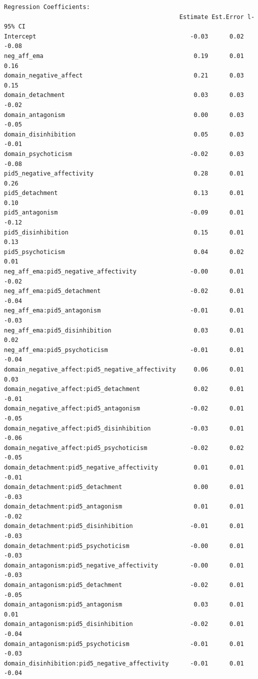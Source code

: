 \documentclass[
  11pt,
  a4paper,
  onecolumn]{article}
\begin{document}
\begin{verbatim}
Regression Coefficients:
                                                 Estimate Est.Error l-95% CI
Intercept                                           -0.03      0.02    -0.08
neg_aff_ema                                          0.19      0.01     0.16
domain_negative_affect                               0.21      0.03     0.15
domain_detachment                                    0.03      0.03    -0.02
domain_antagonism                                    0.00      0.03    -0.05
domain_disinhibition                                 0.05      0.03    -0.01
domain_psychoticism                                 -0.02      0.03    -0.08
pid5_negative_affectivity                            0.28      0.01     0.26
pid5_detachment                                      0.13      0.01     0.10
pid5_antagonism                                     -0.09      0.01    -0.12
pid5_disinhibition                                   0.15      0.01     0.13
pid5_psychoticism                                    0.04      0.02     0.01
neg_aff_ema:pid5_negative_affectivity               -0.00      0.01    -0.02
neg_aff_ema:pid5_detachment                         -0.02      0.01    -0.04
neg_aff_ema:pid5_antagonism                         -0.01      0.01    -0.03
neg_aff_ema:pid5_disinhibition                       0.03      0.01     0.02
neg_aff_ema:pid5_psychoticism                       -0.01      0.01    -0.04
domain_negative_affect:pid5_negative_affectivity     0.06      0.01     0.03
domain_negative_affect:pid5_detachment               0.02      0.01    -0.01
domain_negative_affect:pid5_antagonism              -0.02      0.01    -0.05
domain_negative_affect:pid5_disinhibition           -0.03      0.01    -0.06
domain_negative_affect:pid5_psychoticism            -0.02      0.02    -0.05
domain_detachment:pid5_negative_affectivity          0.01      0.01    -0.01
domain_detachment:pid5_detachment                    0.00      0.01    -0.03
domain_detachment:pid5_antagonism                    0.01      0.01    -0.02
domain_detachment:pid5_disinhibition                -0.01      0.01    -0.03
domain_detachment:pid5_psychoticism                 -0.00      0.01    -0.03
domain_antagonism:pid5_negative_affectivity         -0.00      0.01    -0.03
domain_antagonism:pid5_detachment                   -0.02      0.01    -0.05
domain_antagonism:pid5_antagonism                    0.03      0.01     0.01
domain_antagonism:pid5_disinhibition                -0.02      0.01    -0.04
domain_antagonism:pid5_psychoticism                 -0.01      0.01    -0.03
domain_disinhibition:pid5_negative_affectivity      -0.01      0.01    -0.04

\end{verbatim}
\end{document}
